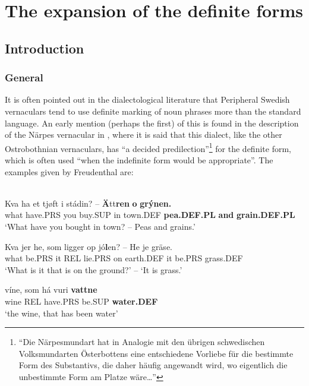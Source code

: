 \newcommand{\textstyleLinguisticExample}[1]{\emph{#1}}
\newcommand{\gl}{}
\newcommand{\textstyleBodyTextFirstChar}{}
\newcommand{\textstyleBodytextCChar}{}

\chapter{The expansion of the definite forms}
\label{bkm:Ref155077895}\label{bkm:Ref156803843}\label{bkm:Ref160007852}\section{ Introduction}
\subsection{ General}

It is often pointed out in the dialectological literature that Peripheral Swedish vernaculars tend to use definite marking of noun phrases more than the standard language. An early mention (perhaps the first) of this is found in the description of the Närpes vernacular in \citet[137]{Freudenthal1878}, where it is said that this dialect, like the other Ostrobothnian vernaculars, has “a decided predilection”\footnote{ “Die Närpesmundart hat in Analogie mit den übrigen schwedischen Volksmundarten Österbottens eine entschiedene Vorliebe für die bestimmte Form des Substantivs, die daher häufig angewandt wird, wo eigentlich die unbestimmte Form am Platze wäre…”} for the definite form, which is often used “when the indefinite form would be appropriate”. The examples given by Freudenthal are:

\ea\label{}
\\
	\ea
		\gll	Kva ha et  tjøft  i  stádin?  --  \textbf{Ä}tt\textbf{ren} \textbf{o} \textbf{grýnen.}\\
				what have.PRS you  buy.SUP  in  town.DEF    \textbf{pea.DEF.PL} \textbf{and} \textbf{grain.DEF.PL}\\
		\glt 	‘What have you bought in town? – Peas and grains.’

	\ex
		\gll	Kva  jer  he,  som  ligger  op  jó\textbf{l}en?  --  He  je  gräse.\\
				what  be.PRS  it  REL  lie.PRS  on  earth.DEF    it  be.PRS  grass.DEF\\
		\glt 	‘What is it that is on the ground?’ – ‘It is grass.’

	\ex
		\gll	víne,  som  há  vuri  \textbf{vattne}\\
				wine  REL  have.PRS  be.SUP  \textbf{water.DEF}\\
		\glt 	‘the wine, that has been water’

